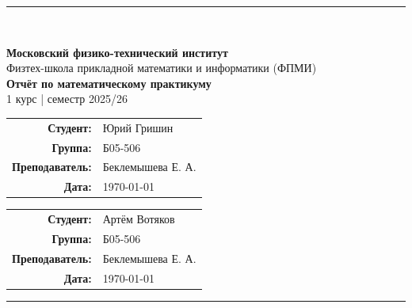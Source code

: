 
\begin{titlepage}
  \thispagestyle{empty}
  \vspace*{1cm}

  {\color{MiptBlue}\rule{\linewidth}{2pt}}\\[0.5cm]

  \begin{center}
    {\Large\bfseries Московский физико-технический институт}\\[0.2cm]
    {\large Физтех-школа прикладной математики и информатики (ФПМИ)}\\[0.8cm]

    {\huge\bfseries Отчёт по математическому практикуму}\\[0.4cm]
    {\large 1 курс \quad| семестр 2025/26}\\[1.2cm]

    \begin{tabular}{rl}
      \textbf{Студент:}     & Юрий Гришин \\[0.3cm]
      \textbf{Группа:}      & Б05-506 \\[0.3cm]
      \textbf{Преподаватель:} & Беклемышева Е. А. \\[0.3cm]
      \textbf{Дата:}        & \today \\
    \end{tabular}
        \begin{tabular}{rl}
      \textbf{Студент:}     & Артём Вотяков \\[0.3cm]
      \textbf{Группа:}      & Б05-506 \\[0.3cm]
      \textbf{Преподаватель:} & Беклемышева Е. А. \\[0.3cm]
      \textbf{Дата:}        & \today \\
    \end{tabular}
  \end{center}

  \vfill
  {\color{MiptBlue}\rule{\linewidth}{2pt}}
\end{titlepage}

